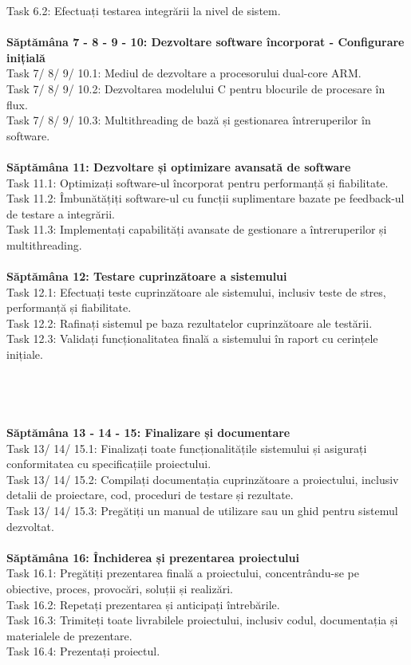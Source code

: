 \documentclass[12pt]{article}
\begin{document}
Task 6.2: Efectuați testarea integrării la nivel de sistem.\\\\
\textbf{Săptămâna 7 - 8 - 9 - 10: Dezvoltare software încorporat - Configurare inițială}\\
Task 7/ 8/ 9/ 10.1: Mediul de dezvoltare a procesorului dual-core ARM.\\
Task 7/ 8/ 9/ 10.2: Dezvoltarea modelului C pentru blocurile de procesare în flux.\\
Task 7/ 8/ 9/ 10.3: Multithreading de bază și gestionarea întreruperilor în software.\\\\
\textbf{Săptămâna 11: Dezvoltare și optimizare avansată de software}\\
Task 11.1: Optimizați software-ul încorporat pentru performanță și fiabilitate.\\
Task 11.2: Îmbunătățiți software-ul cu funcții suplimentare bazate pe feedback-ul de testare a integrării.\\
Task 11.3: Implementați capabilități avansate de gestionare a întreruperilor și multithreading.\\\\
\textbf{Săptămâna 12: Testare cuprinzătoare a sistemului}\\
Task 12.1: Efectuați teste cuprinzătoare ale sistemului, inclusiv teste de stres, performanță și fiabilitate.\\
Task 12.2: Rafinați sistemul pe baza rezultatelor cuprinzătoare ale testării.\\
Task 12.3: Validați funcționalitatea finală a sistemului în raport cu cerințele inițiale.\\\\\\\\\\
\textbf{Săptămâna 13 - 14 - 15: Finalizare și documentare}\\
Task 13/ 14/ 15.1: Finalizați toate funcționalitățile sistemului și asigurați conformitatea cu specificațiile proiectului.\\
Task 13/ 14/ 15.2: Compilați documentația cuprinzătoare a proiectului, inclusiv detalii de proiectare, cod, proceduri de testare și rezultate.\\
Task 13/ 14/ 15.3: Pregătiți un manual de utilizare sau un ghid pentru sistemul dezvoltat.\\\\
\textbf{Săptămâna 16: Închiderea și prezentarea proiectului}\\
Task 16.1: Pregătiți prezentarea finală a proiectului, concentrându-se pe obiective, proces, provocări, soluții și realizări.\\
Task 16.2: Repetați prezentarea și anticipați întrebările.\\
Task 16.3: Trimiteți toate livrabilele proiectului, inclusiv codul, documentația și materialele de prezentare.\\
Task 16.4: Prezentați proiectul.\\\\
\end{document}
